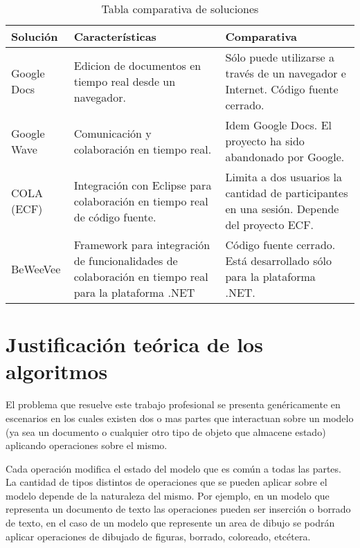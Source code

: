 \documentclass[12pt,a4paper]{article}
\begin{document}
\begin{table}[ht]
    \begin{tabular}{ | p{2.5cm} | p{5cm} | p{5cm} | }
    \hline
    Solución & Características & Comparativa \\ \hline

    Google Docs & Edicion de documentos en tiempo real desde un navegador. &
    Sólo puede utilizarse a través de un navegador e Internet. Código fuente cerrado. \\ \hline

    Google Wave & Comunicación y colaboración en tiempo real. &
    Idem Google Docs. El proyecto ha sido abandonado por Google. \\ \hline

    COLA (ECF) & Integración con Eclipse para colaboración en tiempo real de código fuente. &
	Limita a dos usuarios la cantidad de participantes en una sesión. Depende del proyecto ECF. \\ \hline

    BeWeeVee & Framework para integración de funcionalidades de colaboración en tiempo real para
    la plataforma .NET & Código fuente cerrado. Está desarrollado sólo para la plataforma .NET. \\ \hline

    \end{tabular}
    \caption{\label{soluciones_comparacion} Tabla comparativa de soluciones}
\end{table}

	\section{Justificación teórica de los algoritmos}
	
	El problema que resuelve este trabajo profesional se presenta genéricamente en escenarios en los cuales 
	existen dos o mas partes que interactuan sobre un modelo (ya sea un documento o cualquier otro tipo de 
	objeto que almacene estado) aplicando operaciones sobre el mismo.
	
	Cada operación modifica el estado del modelo que es común a todas las partes. La cantidad de tipos distintos
	de operaciones que se pueden aplicar sobre el modelo depende de la naturaleza del mismo. Por ejemplo, en un
	modelo que representa un documento de texto las operaciones pueden ser inserción o borrado de texto, en el caso
	de un modelo que represente un area de dibujo se podrán aplicar operaciones de dibujado de figuras, 
	borrado, coloreado, etcétera.
	
\end{document}

